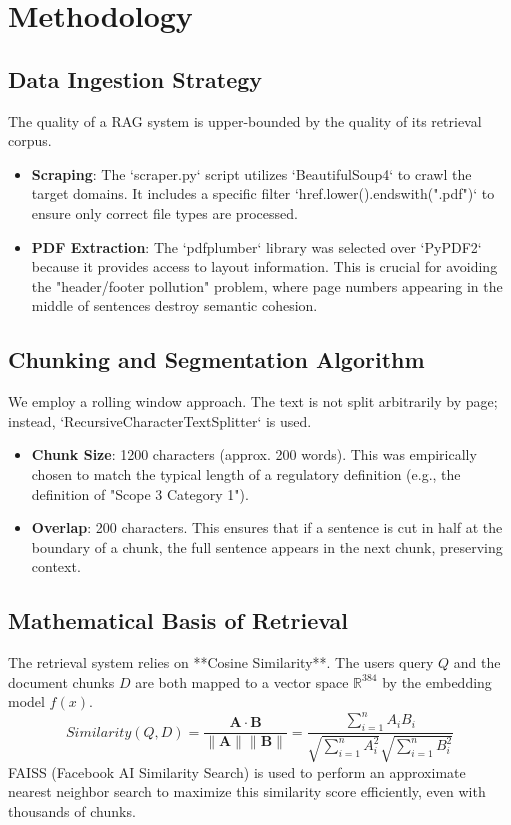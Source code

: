 \documentclass[12pt, a4paper]{article}
\begin{document}
\section{Methodology}
\subsection{Data Ingestion Strategy}
The quality of a RAG system is upper-bounded by the quality of its retrieval corpus.
\begin{itemize}
    \item \textbf{Scraping}: The `scraper.py` script utilizes `BeautifulSoup4` to crawl the target domains. It includes a specific filter `href.lower().endswith(".pdf")` to ensure only correct file types are processed.
    \item \textbf{PDF Extraction}: The `pdfplumber` library was selected over `PyPDF2` because it provides access to layout information. This is crucial for avoiding the "header/footer pollution" problem, where page numbers appearing in the middle of sentences destroy semantic cohesion.
\end{itemize}

\subsection{Chunking and Segmentation Algorithm}
We employ a rolling window approach. The text is not split arbitrarily by page; instead, `RecursiveCharacterTextSplitter` is used.
\begin{itemize}
    \item \textbf{Chunk Size}: 1200 characters (approx. 200 words). This was empirically chosen to match the typical length of a regulatory definition (e.g., the definition of "Scope 3 Category 1").
    \item \textbf{Overlap}: 200 characters. This ensures that if a sentence is cut in half at the boundary of a chunk, the full sentence appears in the next chunk, preserving context.
\end{itemize}

\subsection{Mathematical Basis of Retrieval}
The retrieval system relies on **Cosine Similarity**. The users query $Q$ and the document chunks $D$ are both mapped to a vector space $\mathbb{R}^{384}$ by the embedding model $f(x)$.
\begin{equation}
    Similarity(Q, D) = \frac{\mathbf{A} \cdot \mathbf{B}}{\|\mathbf{A}\| \|\mathbf{B}\|} = \frac{\sum_{i=1}^{n} A_i B_i}{\sqrt{\sum_{i=1}^{n} A_i^2} \sqrt{\sum_{i=1}^{n} B_i^2}}
\end{equation}
FAISS (Facebook AI Similarity Search) is used to perform an approximate nearest neighbor search to maximize this similarity score efficiently, even with thousands of chunks.
\end{document}
